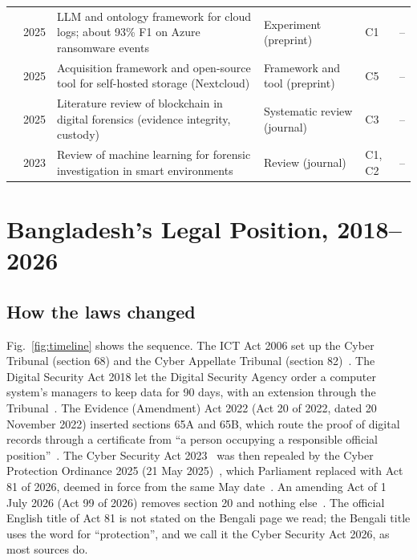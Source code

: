 \documentclass[conference]{IEEEtran}
\begin{document}
\begin{table}[t]
\begin{tabularx}{\textwidth}{@{}l l X l l c@{}}
\cite{ciaf} & 2025 & LLM and ontology framework for cloud logs; about 93\% F1 on Azure ransomware events & Experiment (preprint) & C1 & -- \\
\cite{kulper} & 2025 & Acquisition framework and open-source tool for self-hosted storage (Nextcloud) & Framework and tool (preprint) & C5 & -- \\
\cite{igonor} & 2025 & Literature review of blockchain in digital forensics (evidence integrity, custody) & Systematic review (journal) & C3 & -- \\
\cite{tageldin} & 2023 & Review of machine learning for forensic investigation in smart environments & Review (journal) & C1, C2 & -- \\
\bottomrule
\end{tabularx}
\end{table}

\section{Bangladesh's Legal Position, 2018--2026}
\subsection{How the laws changed}
Fig.~\ref{fig:timeline} shows the sequence. The ICT Act 2006 set up the Cyber Tribunal (section 68) and the Cyber Appellate Tribunal (section 82)~\cite{cyberact}. The Digital Security Act 2018 let the Digital Security Agency order a computer system's managers to keep data for 90 days, with an extension through the Tribunal~\cite{unodc}. The Evidence (Amendment) Act 2022 (Act 20 of 2022, dated 20 November 2022) inserted sections 65A and 65B, which route the proof of digital records through a certificate from ``a person occupying a responsible official position''~\cite{evidence}. The Cyber Security Act 2023~\cite{act2023} was then repealed by the Cyber Protection Ordinance 2025 (21 May 2025)~\cite{ordinance}, which Parliament replaced with Act 81 of 2026, deemed in force from the same May date~\cite{cyberact}. An amending Act of 1 July 2026 (Act 99 of 2026) removes section 20 and nothing else~\cite{amend}. The official English title of Act 81 is not stated on the Bengali page we read; the Bengali title uses the word for ``protection'', and we call it the Cyber Security Act 2026, as most sources do.
\end{document}
